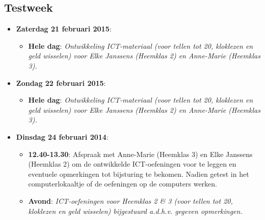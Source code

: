 \documentclass[a4paper,11pt]{article}
\theoremstyle{definition}
\begin{document}
\subsection{Testweek}
\begin{itemize}
  \item \textbf{Zaterdag 21 februari 2015}:
  \begin{itemize}
    \item \textbf{Hele dag}: \emph{ Ontwikkeling ICT-materiaal (voor tellen tot 20, kloklezen en geld wisselen)
  voor Elke Janssens (Heemklas 2) en Anne-Marie (Heemklas 3).}
  \end{itemize}

  

   \item \textbf{Zondag 22 februari 2015}:  \begin{itemize}
    \item \textbf{Hele dag}: \emph{ Ontwikkeling ICT-materiaal (voor tellen tot 20, kloklezen en geld wisselen)
  voor Elke Janssens (Heemklas 2) en Anne-Marie (Heemklas 3).}
  \end{itemize}

  \item  \textbf{Dinsdag 24 februari 2014}:     
  \begin{itemize}
    \item \textbf{12.40-13.30}:   Afspraak met Anne-Marie (Heemklas 3) en Elke Janssens (Heemklas 2) om de ontwikkelde ICT-oefeningen voor te leggen
    en eventuele opmerkingen tot bijsturing te bekomen. Nadien getest in het computerlokaaltje of de oefeningen op de computers werken.
    \item \textbf{Avond}: \emph{ICT-oefeningen voor Heemklas 2 \& 3 (voor tellen tot 20, kloklezen en geld wisselen) bijgestuurd a.d.h.v. gegeven opmerkingen.}
  \end{itemize}
  

\end{itemize}
\end{document}
